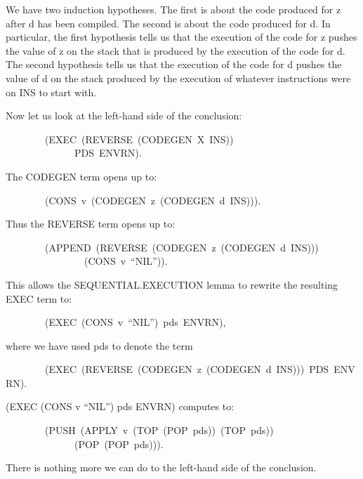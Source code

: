 \documentclass[10pt]{book}
\newenvironment{pubasis}{\begin{flushleft}}{\end{flushleft}}
\begin{document}
We have two induction hypotheses.
The first is about the code produced for z after d has been
compiled.  The second is about the code produced for d.
In particular, the first hypothesis tells us that the execution of
the code for z   pushes the value of z on the stack that
is produced by the execution of the code for d.  The second hypothesis
tells us that the execution of the code for d   pushes the
value of d on the stack produced by the execution of whatever
instructions were on INS to start with.

Now let us look at the left-hand side of the
conclusion:
\begin{pubasis}
~~~~~~~~(EXEC~(REVERSE~(CODEGEN~X~INS))\\
~~~~~~~~~~~~~~PDS~ENVRN).\\
\end{pubasis}
The CODEGEN term opens up to:
\begin{pubasis}
~~~~~~~~(CONS~v~(CODEGEN~z~(CODEGEN~d~INS))).\\
\end{pubasis}
Thus the REVERSE term opens up to:
\begin{pubasis}
~~~~~~~~(APPEND~(REVERSE~(CODEGEN~z~(CODEGEN~d~INS)))\\
~~~~~~~~~~~~~~~~(CONS~v~``NIL'')).\\
\end{pubasis}
This allows the SEQUENTIAL.EXECUTION lemma to rewrite the resulting EXEC
term to:
\begin{pubasis}
~~~~~~~~(EXEC~(CONS~v~``NIL'')~pds~ENVRN),\\
\end{pubasis}
where we have used pds to denote the term
\begin{pubasis}
~~~~~~~~(EXEC~(REVERSE~(CODEGEN~z~(CODEGEN~d~INS)))~PDS~ENVRN).\\
\end{pubasis}
(EXEC (CONS v ``NIL'') pds ENVRN) computes to:
\begin{pubasis}
~~~~~~~~(PUSH~(APPLY~v~(TOP~(POP~pds))~(TOP~pds))\\
~~~~~~~~~~~~~~(POP~(POP~pds))).\\
\end{pubasis}
There is nothing more we can do to the left-hand side of the conclusion.
\end{document}

